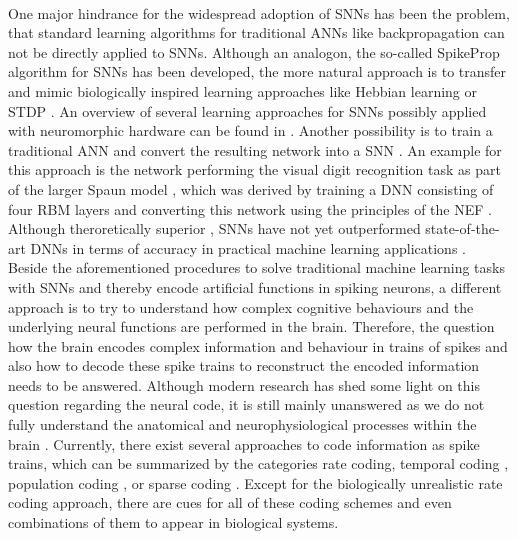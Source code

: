 \\
One major hindrance for the widespread adoption of \acp{SNN} has been the problem, that standard learning algorithms for traditional \acp{ANN} like backpropagation \cite{Werbos1974} can not be directly applied to \acp{SNN}.
Although an analogon, the so-called SpikeProp algorithm \cite{Bohte2002} for \acp{SNN} has been developed, the more natural approach is to transfer and mimic biologically inspired learning approaches like Hebbian learning \cite{Hebb1949} or \ac{STDP} \cite{Bi2001}.
An overview of several learning approaches for \acp{SNN} possibly applied with neuromorphic hardware can be found in \cite{Walter2015}.
Another possibility is to train a traditional \ac{ANN} and convert the resulting network into a \ac{SNN} \cite{Diehl2015, Hunsberger2015}.
An example for this approach is the network performing the visual digit recognition task as part of the larger \ac{Spaun} model \cite{Eliasmith2012}, which was derived by training a \ac{DNN} consisting of four \ac{RBM} layers and converting this network using the principles of the \ac{NEF} \cite{Eliasmith2003}.
Although theroretically superior \cite{Maass1997}, \acp{SNN} have not yet outperformed state-of-the-art \acp{DNN} in terms of accuracy in practical machine learning applications \cite{Schmidhuber2015}.\\
Beside the aforementioned procedures to solve traditional machine learning tasks with \acp{SNN} and thereby encode artificial functions in spiking neurons, a different approach is to try to understand how complex cognitive behaviours and the underlying neural functions are performed in the brain.
Therefore, the question how the brain encodes complex information and behaviour in trains of spikes and also how to decode these spike trains to reconstruct the encoded information needs to be answered. 
Although modern research has shed some light on this question regarding the neural code, it is still mainly unanswered as we do not fully understand the anatomical and neurophysiological processes within the brain \cite{Stanley2013}.
Currently, there exist several approaches to code information as spike trains, which can be summarized by the categories rate coding, temporal coding \cite[Chap. 7.6]{Gerstner2014}, population coding \cite[Chap. 1]{Gerstner2002}, \cite{Ponulak2011, Boerlin2011} or sparse coding \cite{Olshausen1996}.
Except for the biologically unrealistic rate coding approach, there are cues for all of these coding schemes and even combinations \cite{Gupta2014} of them to appear in biological systems.

